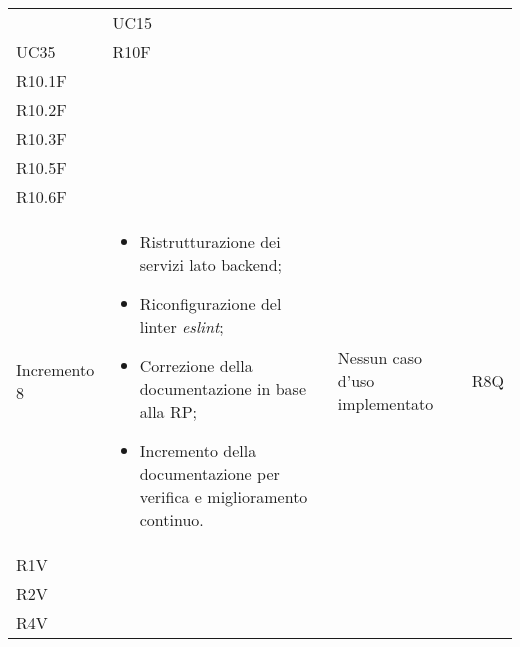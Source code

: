 \begin{longtable}{
    >{\centering}p{}
    >{\raggedright}p{}
    >{\centering}p{}
    >{\centering}p{}
    }
                                  & UC15                                                                                           \\ UC35                                                                 & R10F                                                                                                       \\ R10.1F \\ R10.2F \\ R10.3F \\ R10.5F\\ R10.6F
    \tabularnewline

    Incremento 8
                                  &
    \vspace{-15px}
    \begin{itemize}
        \renewcommand\labelitemi{-}
        \item Ristrutturazione dei servizi lato backend;
        \item Riconfigurazione del linter \textit{eslint};
        \item Correzione della documentazione in base alla RP;
        \item Incremento della documentazione per verifica e miglioramento continuo.
    \end{itemize}
                                  & Nessun caso d'uso implementato & R8Q                                                           \\ R1V \\ R2V \\ R4V    \tabularnewline


\end{longtable}
